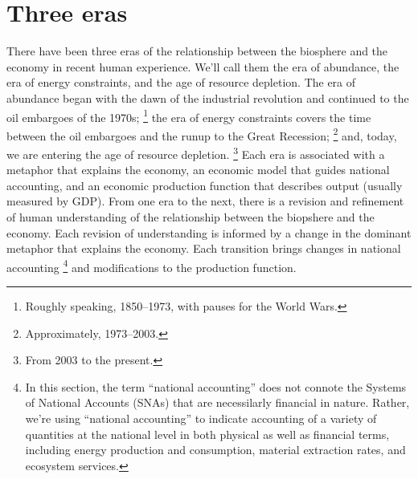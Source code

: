 %
%
%

\section{Three eras}
\label{sec:three_eras}

There have been three eras 
of the relationship between the biosphere and the economy
in recent human experience.
We'll call them 
the era of abundance, 
the era of energy constraints, and 
the age of resource depletion.
The era of abundance began 
with the dawn of the industrial revolution
and continued to the oil embargoes of the 1970s;%
	\footnote{
	Roughly speaking, 1850--1973,
	with pauses for the World Wars.
	}
the era of energy constraints covers
the time between the oil embargoes and 
the runup to the Great Recession;%
	\footnote{
	Approximately, 1973--2003.
	}
and, today, we are entering the age of resource depletion.%
	\footnote{
	From 2003 to the present.
	}
Each era is associated with 
a metaphor that explains the economy,
an economic model that guides national accounting, and
an economic production function that describes output 
(usually measured by GDP).
From one era to the next, there is a revision and refinement of 
human understanding of the relationship between the biopshere and the economy.
Each revision of understanding is informed by a change in the dominant metaphor
that explains the economy.
Each transition brings changes in national accounting%
	\footnote{
	In this section, 
	the term ``national accounting'' does not connote the
	Systems of National Accounts (SNAs) that are necessilarly financial in nature.
	Rather, we're using ``national accounting'' to indicate
	accounting of a variety of quantities at the national level
	in both physical as well as financial terms, 
	including energy production and consumption, 
	material extraction rates,
	and ecosystem services.
	}
and modifications to the production function.

